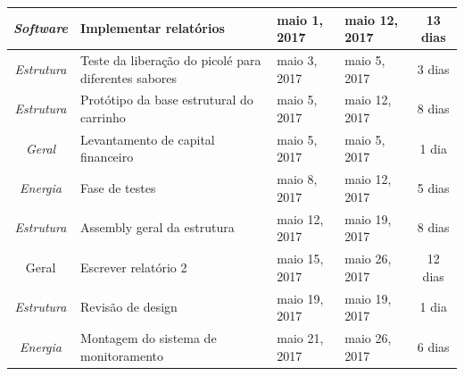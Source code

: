 \begin{longtable}{|c|m{6.5cm}|m{3.2cm}|m{3.2cm}|c|}
\textit{Software}                                                         & Implementar relatórios                               & maio 1, 2017                         & maio 12, 2017                     & 13 dias                               \\ \hline
\textit{Estrutura}                                                        & Teste da liberação do picolé para diferentes sabores & maio 3, 2017                         & maio 5, 2017                      & 3 dias                                \\ \hline
\textit{Estrutura}                                                        & Protótipo da base estrutural do carrinho             & maio 5, 2017                         & maio 12, 2017                     & 8 dias                                \\ \hline
\textit{Geral}                                                            & Levantamento de capital financeiro                   & maio 5, 2017                         & maio 5, 2017                      & 1 dia                                 \\ \hline
\textit{Energia}                                                          & Fase de testes                                       & maio 8, 2017                         & maio 12, 2017                     & 5 dias                                \\ \hline
\textit{Estrutura}                                                        & Assembly geral da estrutura                          & maio 12, 2017                        & maio 19, 2017                     & 8 dias                                \\ \hline
Geral                                                                     & Escrever relatório 2                                 & maio 15, 2017                        & maio 26, 2017                     & 12 dias                               \\ \hline
\textit{Estrutura}                                                        & Revisão de design                                    & maio 19, 2017                        & maio 19, 2017                     & 1 dia                                 \\ \hline
\textit{Energia}                                                          & Montagem do sistema de monitoramento                 & maio 21, 2017                        & maio 26, 2017                     & 6 dias                                \\ \hline

\end{longtable}
